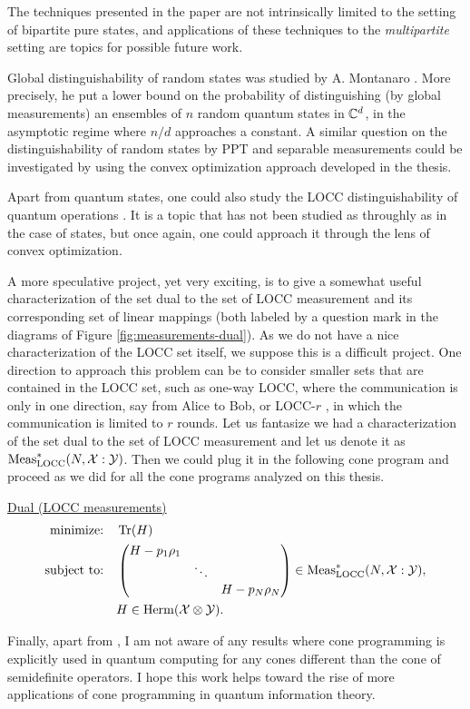 The techniques presented in the paper are not intrinsically limited 
to the setting of bipartite pure states, and applications of these techniques to
the \emph{multipartite} setting are topics for possible future work.

Global distinguishability of random states was studied by A. Montanaro \cite{Montanaro07}.
More precisely, he put a lower bound on the probability of distinguishing 
(by global measurements) an ensembles of $n$ random quantum states in $\mathbb{C}^{d}$,
in the asymptotic regime where $n/d$ approaches a constant. A similar question 
on the distinguishability of random states by PPT and separable measurements 
could be investigated by using the convex optimization approach developed in the thesis.

Apart from quantum states, one could also study the LOCC distinguishability of 
quantum operations \cite{Matthews10}. It is a topic that has not been studied as throughly
as in the case of states, but once again, one could approach it through 
the lens of convex optimization.

A more speculative project, yet very exciting, is to give a somewhat useful 
characterization of the set dual to the set of LOCC measurement and its corresponding
set of linear mappings (both labeled by a question mark in the diagrams of Figure \ref{fig:measurements-dual}).
As we do not have a nice characterization of the LOCC set itself, we suppose
this is a difficult project. One direction to approach this problem
can be to consider smaller sets that are contained in the LOCC set, such as 
one-way LOCC, where the communication is only in one direction, say from
Alice to Bob, or LOCC-$r$ , in which the communication is limited to $r$ rounds.
Let us fantasize we had a characterization of the set dual to the set of LOCC measurement
and let us denote it as $\mathrm{Meas}_{\mathrm{LOCC}}^{\ast}(N, \mathcal{X}:\mathcal{Y})$. Then we could plug it in the 
following cone program and proceed as we did for all the cone programs analyzed 
on this thesis.
\begin{center}
\underline{Dual (LOCC measurements)}
  \begin{equation}
    \label{eq:locc-dual-problem}
    \begin{split}
      \text{minimize:} \quad & \operatorname{Tr}(H)\\
      \text{subject to:}
       \quad & 
        \begin{pmatrix}
            H - p_{1}\rho_{1} & & \\
             & \ddots & \\
             & & H - p_{N}\rho_{N}
       \end{pmatrix}\in \mathrm{Meas}_{\mathrm{LOCC}}^{\ast}(N, \mathcal{X}:\mathcal{Y}),\\
       \quad & H \in \mathrm{Herm}(\mathcal{X}\otimes\mathcal{Y}).
    \end{split}
  \end{equation}
\end{center}

Finally, apart from \cite{Gharibian13}, I am not aware of any results where 
cone programming is explicitly used in quantum computing for any cones different than the 
cone of semidefinite operators. 
I hope this work helps toward the rise of more applications of cone programming
in quantum information theory.
